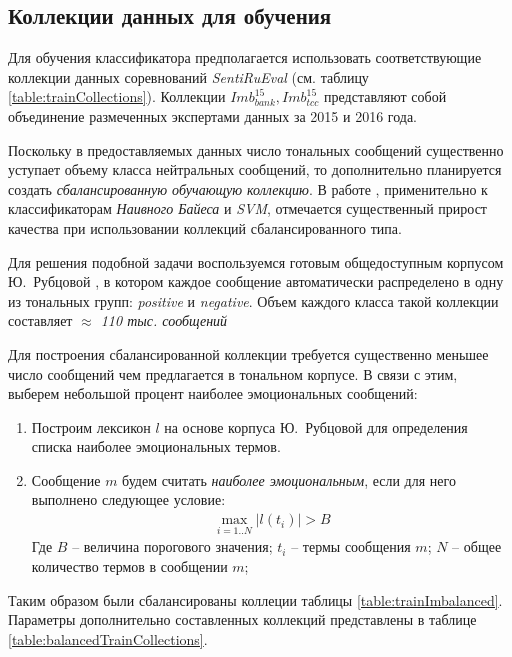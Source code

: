 \subsection{Коллекции данных для обучения}
    Для обучения классификатора предполагается использовать соответствующие
    коллекции данных соревнований {\it SentiRuEval} (см. таблицу
    \ref{table:trainCollections}).
    Коллекции $Imb_{bank}^{15}, Imb_{tcc}^{15}$ представляют собой объединение
    размеченных экспертами данных за 2015 и 2016 года.

    

    Поскольку в предоставляемых
    данных число тональных сообщений существенно уступает объему класса
    нейтральных сообщений, то дополнительно планируется создать {\it сбалансированную
    обучающую коллекцию}.
    В работе \cite{diploma2015}, применительно к классификаторам {\it
    Наивного Байеса} и {\it SVM}, отмечается существенный прирост качества при
    использовании коллекций сбалансированного типа.

    Для решения подобной задачи воспользуемся готовым общедоступным корпусом Ю.~Рубцовой
    \cite{rubtsovaCollection}, в
    котором каждое сообщение автоматически распределено в одну из тональных групп:
    {\it positive} и {\it negative}.
    Объем каждого класса такой коллекции составляет {\it $\approx$ 110 тыс.
    сообщений}

    Для построения сбалансированной коллекции требуется существенно меньшее
    число сообщений чем предлагается в тональном корпусе.
    В связи с этим, выберем небольшой процент наиболее эмоциональных сообщений:
    \begin{enumerate}
        \item Построим лексикон $l$ на основе корпуса Ю.~Рубцовой для определения
            списка наиболее эмоциональных термов.
        \item Сообщение $m$ будем считать {\it наиболее эмоциональным},
            если для него выполнено следующее условие:
            \begin{gather}
                \max\limits_{i=1..N} |l(t_i)| > B
            \end{gather}
            Где $B$ -- величина порогового значения; \hspace{0.5pt}
            $t_i$ -- термы сообщения $m$; \hspace{0.5pt}
            $N$ -- общее количество термов в сообщении $m$;
    \end{enumerate}

    Таким образом были сбалансированы коллеции таблицы \ref{table:trainImbalanced}.
    Параметры дополнительно составленных коллекций представлены
    в таблице \ref{table:balancedTrainCollections}.

    
